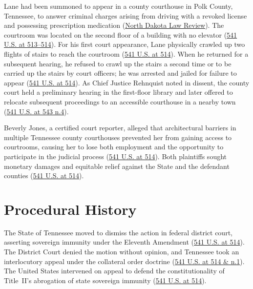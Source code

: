 \documentclass[12pt]{article}
\begin{document}
Lane had been summoned to appear in a county courthouse in Polk County, Tennessee, to answer criminal charges arising from driving with a revoked license and possessing prescription medication (\href{https://commons.und.edu/cgi/viewcontent.cgi?article=1006&context=ndlr}{North Dakota Law Review}). The courtroom was located on the second floor of a building with no elevator (\href{https://www.law.cornell.edu/supremecourt/text/541/509}{541 U.S. at 513--514}). For his first court appearance, Lane physically crawled up two flights of stairs to reach the courtroom (\href{https://www.law.cornell.edu/supremecourt/text/541/509}{541 U.S. at 514}). When he returned for a subsequent hearing, he refused to crawl up the stairs a second time or to be carried up the stairs by court officers; he was arrested and jailed for failure to appear (\href{https://www.law.cornell.edu/supremecourt/text/541/509}{541 U.S. at 514}). As Chief Justice Rehnquist noted in dissent, the county court held a preliminary hearing in the first-floor library and later offered to relocate subsequent proceedings to an accessible courthouse in a nearby town (\href{https://www.law.cornell.edu/supremecourt/text/541/509}{541 U.S. at 543 n.4}).

Beverly Jones, a certified court reporter, alleged that architectural barriers in multiple Tennessee county courthouses prevented her from gaining access to courtrooms, causing her to lose both employment and the opportunity to participate in the judicial process (\href{https://www.law.cornell.edu/supremecourt/text/541/509}{541 U.S. at 514}). Both plaintiffs sought monetary damages and equitable relief against the State and the defendant counties (\href{https://www.law.cornell.edu/supremecourt/text/541/509}{541 U.S. at 514}).

\section{Procedural History}
The State of Tennessee moved to dismiss the action in federal district court, asserting sovereign immunity under the Eleventh Amendment (\href{https://www.law.cornell.edu/supremecourt/text/541/509}{541 U.S. at 514}). The District Court denied the motion without opinion, and Tennessee took an interlocutory appeal under the collateral order doctrine (\href{https://www.law.cornell.edu/supremecourt/text/541/509}{541 U.S. at 514 \& n.1}). The United States intervened on appeal to defend the constitutionality of Title~II's abrogation of state sovereign immunity (\href{https://www.law.cornell.edu/supremecourt/text/541/509}{541 U.S. at 514}).
\end{document}
